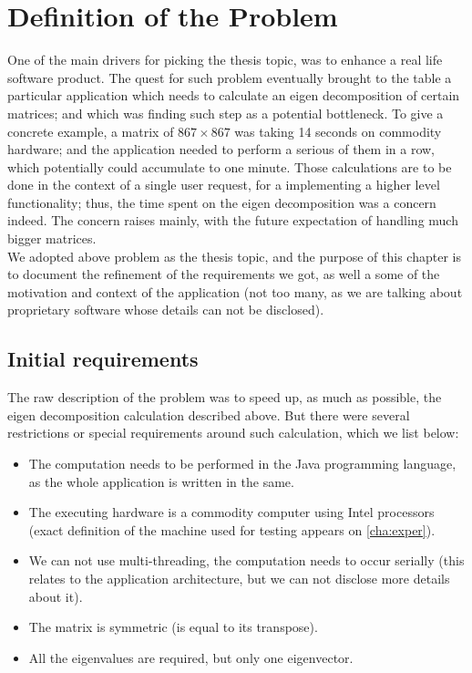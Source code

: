\chapter{Definition of the Problem}

One of the main drivers for picking the thesis topic, was to enhance a
real life software product. The quest for such problem eventually
brought to the table a particular application which needs to calculate
an eigen decomposition of certain matrices; and which was finding such step
as a potential bottleneck. To give a concrete example, a matrix of  $867
\times 867$ was taking 14 seconds on commodity hardware; and the
application needed to perform a serious of them in a row, which
potentially could accumulate to one minute. Those calculations are
to be done in the context of a single user request, for a implementing
a higher level functionality; thus, the time spent on the eigen
decomposition was a concern indeed. The concern raises mainly, with
the future expectation of handling much bigger matrices. \\

We adopted above problem as the thesis topic, and the purpose of this
chapter is to document the refinement of the
requirements we got, as well a some of the motivation and context of
the application (not too many, as we are talking about proprietary
software whose details can not be disclosed). 

\section{Initial requirements}

The raw description of the problem was to speed up, as much as
possible, the eigen decomposition calculation described above. But
there were several restrictions or special requirements around such
calculation, which we list below:

\begin{itemize}
  \item The computation needs to be performed in the Java programming
    language, as the whole application is written in the same. \\
  \item The executing hardware is a commodity computer using Intel
    processors (exact definition of the machine used for testing
    appears on \cref{cha:exper}).
  \item We can not use multi-threading, the computation needs to occur
    serially (this relates to the application architecture, but we can
    not disclose more details about it). \\
  \item The matrix is symmetric (is equal to its transpose). \\
  \item All the eigenvalues are required, but only one eigenvector.
\end{itemize}
\hfill

